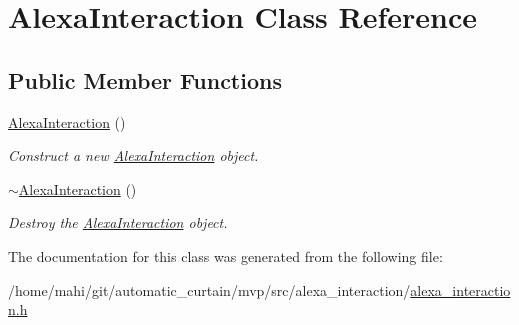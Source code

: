 \hypertarget{classAlexaInteraction}{}\section{Alexa\+Interaction Class Reference}
\label{classAlexaInteraction}
\subsection*{Public Member Functions}
\begin{DoxyCompactItemize}
\item 
\mbox{\label{classAlexaInteraction_a3f443183dadb9532034aa837a13449ab}} 
\hyperlink{classAlexaInteraction_a3f443183dadb9532034aa837a13449ab}{Alexa\+Interaction} ()
\begin{DoxyCompactList}\small\item\em Construct a new \hyperlink{classAlexaInteraction}{Alexa\+Interaction} object. \end{DoxyCompactList}\item 
\mbox{\label{classAlexaInteraction_a469eb0982e4de6c665b46e4b510b2503}} 
\hyperlink{classAlexaInteraction_a469eb0982e4de6c665b46e4b510b2503}{$\sim$\+Alexa\+Interaction} ()
\begin{DoxyCompactList}\small\item\em Destroy the \hyperlink{classAlexaInteraction}{Alexa\+Interaction} object. \end{DoxyCompactList}\end{DoxyCompactItemize}


The documentation for this class was generated from the following file\+:\begin{DoxyCompactItemize}
\item 
/home/mahi/git/automatic\+\_\+curtain/mvp/src/alexa\+\_\+interaction/\hyperlink{alexa__interaction_8h}{alexa\+\_\+interaction.\+h}\end{DoxyCompactItemize}
